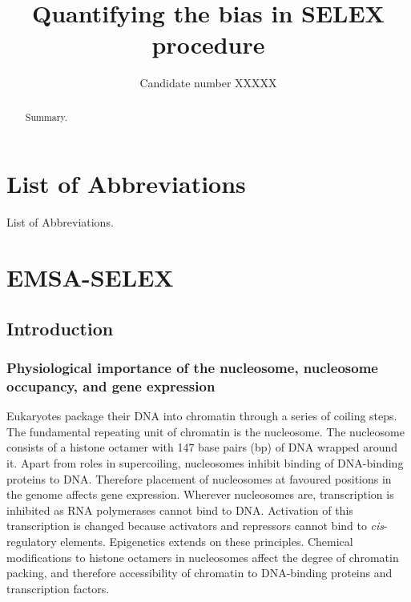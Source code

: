 \documentclass[parskip=full, numbers=noenddot]{scrreprt}
\title{Quantifying the bias in SELEX procedure}
\author{Candidate number XXXXX}
\begin{document}
\maketitle

\begin{abstract}
 
Summary.
 
\end{abstract}

\tableofcontents

\chapter*{List of Abbreviations}
\label{ch:abbrev}

List of Abbreviations.

\chapter{EMSA-SELEX}
\label{ch:emsaselex}

\section{Introduction}
\label{sec:emsaselex_intro}

\subsection{Physiological importance of the nucleosome, nucleosome occupancy, and gene expression}
\label{ssec:emsaselex_intro_importance}


Eukaryotes package their DNA into chromatin through a series of coiling steps.  The fundamental repeating unit of chromatin is the nucleosome.  The nucleosome consists of a histone octamer with 147 base pairs (bp) of DNA wrapped around it.  Apart from roles in supercoiling, nucleosomes inhibit binding of DNA-binding proteins to DNA.  Therefore placement of nucleosomes at favoured positions in the genome affects gene expression.  Wherever nucleosomes are, transcription is inhibited as RNA polymerases cannot bind to DNA.  Activation of this transcription is changed because activators and repressors cannot bind to \emph{cis}-regulatory elements.
Epigenetics extends on these principles.  Chemical modifications to histone octamers in nucleosomes affect the degree of chromatin packing, and therefore accessibility of chromatin to DNA-binding proteins and transcription factors.
\end{document}
